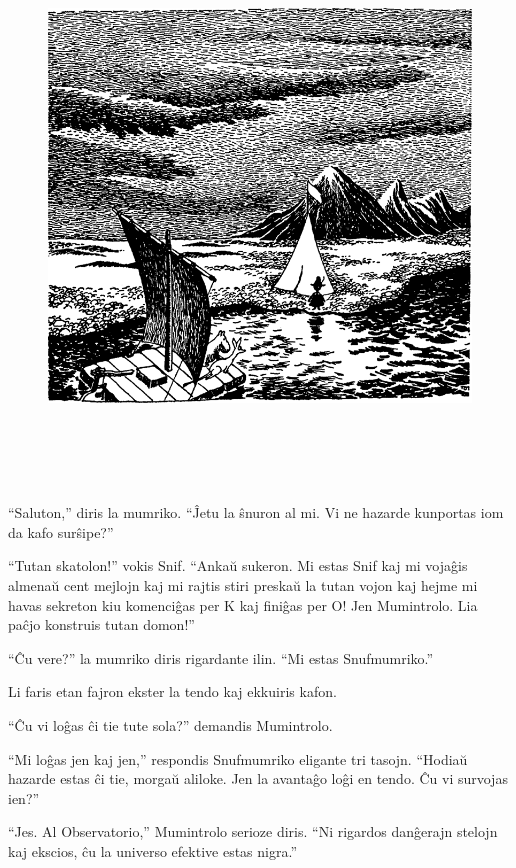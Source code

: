 \begin{figure}[htbp]
\centering
\includegraphics[width=450pt,height=419pt]{3-4.png}
\caption{}
\label{3-4}
\end{figure}

``Saluton,'' diris la mumriko. ``Ĵetu la ŝnuron al mi. Vi ne hazarde kunportas iom da kafo surŝipe?''

``Tutan skatolon!'' vokis Snif. ``Ankaŭ sukeron. Mi estas Snif kaj mi vojaĝis almenaŭ cent mejlojn kaj mi rajtis stiri preskaŭ la tutan vojon kaj hejme mi havas sekreton kiu komenciĝas per K kaj finiĝas per O! Jen Mumintrolo. Lia paĉjo konstruis tutan domon!''

``Ĉu vere?'' la mumriko diris rigardante ilin. ``Mi estas Snufmumriko.''

Li faris etan fajron ekster la tendo kaj ekkuiris kafon.

``Ĉu vi loĝas ĉi tie tute sola?'' demandis Mumintrolo.

``Mi loĝas jen kaj jen,'' respondis Snufmumriko eligante tri tasojn. ``Hodiaŭ hazarde estas ĉi tie, morgaŭ aliloke. Jen la avantaĝo loĝi en tendo. Ĉu vi survojas ien?''

``Jes. Al Observatorio,'' Mumintrolo serioze diris. ``Ni rigardos danĝerajn stelojn kaj ekscios, ĉu la universo efektive estas nigra.''

